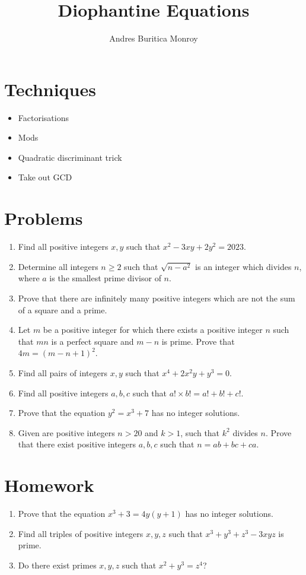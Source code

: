 \documentclass{article}
\title{Diophantine Equations}
\author{Andres Buritica Monroy}
\date{}
\begin{document}
\maketitle
\section{Techniques}
\begin{itemize}
  \item Factorisations
  \item Mods
  \item Quadratic discriminant trick
  \item Take out GCD
\end{itemize}
\section{Problems}
\begin{enumerate}
  \item Find all positive integers $x, y$ such that $x^2-3xy+2y^2=2023$.
  \item Determine all integers $n \geq 2$ such that $\sqrt{n-a^2}$ is an integer
    which divides $n$, where $a$ is the smallest prime divisor of $n$.
  \item Prove that there are infinitely many positive integers which are not the
    sum of a square and a prime.
  \item Let $m$ be a positive integer for which there exists a positive integer
    $n$ such that $mn$ is a perfect square and $m-n$ is
    prime. Prove that $4m=(m-n+1)^2$.
  \item Find all pairs of integers $x,y$ such that $x^4+2x^2y+y^3=0$.
  \item Find all positive integers $a, b, c$ such that $a! \times b! = a! +
    b! + c!$.
  \item Prove that the equation $y^2=x^3+7$ has no integer solutions.
  \item Given are positive integers $n>20$ and $k>1$, such that $k^2$ divides
      $n$. Prove that there exist
      positive integers $a, b, c$ such that $n=ab+bc+ca$.
\end{enumerate}
\newpage
\section{Homework}
  \begin{enumerate}
    \item Prove that the equation $x^3+3=4y(y+1)$ has no integer solutions.
    \item Find all triples of positive integers $x, y, z$ such that
      $x^3+y^3+z^3-3xyz$ is prime.
    \item Do there exist primes $x,y,z$ such that $x^2+y^3=z^4$?
  \end{enumerate}
\end{document}
